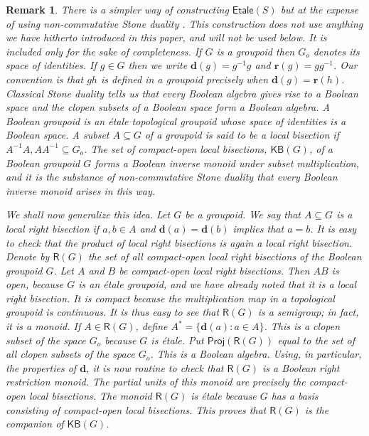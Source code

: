 \documentclass[a4paper]{amsart}
\newtheorem{remark}[theorem]{Remark}
\begin{document}
\begin{remark}{\em There is a simpler way of constructing $\mathsf{Etale}(S)$ but at the expense
of using non-commutative Stone duality \cite{Lawson2024}.
This construction does not use anything we have hitherto introduced in this paper,
and will not be used below.
It is included only for the sake of completeness.
If $G$ is a groupoid then $G_{o}$ denotes its space of identities.
If $g \in G$ then we write $\mathbf{d}(g) = g^{-1}g$ and $\mathbf{r}(g) = gg^{-1}$.
Our convention is that $gh$ is defined in a groupoid precisely when $\mathbf{d}(g) = \mathbf{r}(h)$.
Classical Stone duality tells us that every Boolean algebra gives rise to a Boolean space
and the clopen subsets of a Boolean space form a Boolean algebra.
A {\em Boolean groupoid} is an \'etale topological groupoid whose space of identities is a Boolean space.
A subset $A \subseteq G$ of a groupoid is said to be a {\em local bisection} if $A^{-1}A,AA^{-1} \subseteq G_{o}$.
The set of compact-open local bisections, $\mathsf{KB}(G)$, of a Boolean groupoid  $G$ forms a Boolean inverse monoid
under subset multiplication,
and it is the substance of non-commutative Stone duality that every Boolean inverse monoid arises in this way.

We shall now generalize this idea.
Let $G$ be a groupoid.
We say that $A \subseteq G$ is a {\em local right bisection}
if $a,b \in A$ and $\mathbf{d}(a)  = \mathbf{d}(b)$ implies that $a = b$.
It is easy to check that the product of local right bisections is again a local right bisection.
Denote by $\mathsf{R}(G)$ the set of all compact-open local right bisections of the Boolean groupoid $G$.
Let $A$ and $B$ be compact-open local right bisections.
Then $AB$ is open, because $G$ is an \'etale groupoid, and we have already noted that it is a local right bisection.
It is compact because the multiplication map in a topological groupoid is continuous.
It is thus easy to see that $\mathsf{R}(G)$ is a semigroup; in fact, it is a monoid.
If $A \in \mathsf{R}(G)$, define $A^{\ast} = \{\mathbf{d}(a) \colon a \in A \}$.
This is a clopen subset of the space $G_{o}$ because $G$ is \'etale. 
Put $\mathsf{Proj} (\mathsf{R}(G))$ equal to the set of all clopen subsets of the space $G_{o}$.
This is a Boolean algebra.
Using, in particular,  the properties of $\mathbf{d}$, it is now routine to check that $\mathsf{R}(G)$ is a Boolean right restriction monoid.
The partial units of this monoid are precisely the compact-open local bisections.
The monoid $\mathsf{R}(G)$ is \'etale because $G$ has a basis consisting of compact-open local bisections.
This proves that $\mathsf{R}(G)$ is the companion of $\mathsf{KB}(G)$.

}
\end{remark}
\end{document}
